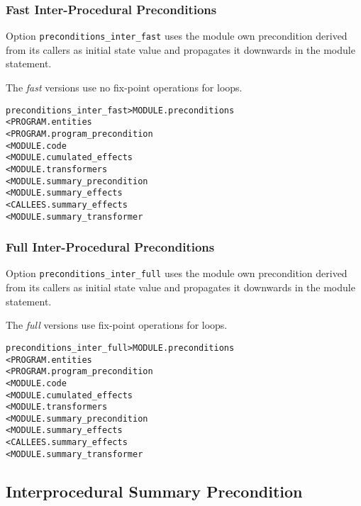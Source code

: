 \documentclass[a4paper]{report}
\newenvironment{PipsMake}{\begin{alltt}}{\end{alltt}}
\begin{document}
\subsubsection{Fast Inter-Procedural Preconditions}

Option \verb+preconditions_inter_fast+ uses the module own precondition
derived from its callers as initial state value and propagates it
downwards in the module statement.

The {\em fast} versions use no fix-point operations for loops.


\begin{PipsMake}

preconditions_inter_fast        > MODULE.preconditions
        < PROGRAM.entities
        < PROGRAM.program_precondition
        < MODULE.code
        < MODULE.cumulated_effects
        < MODULE.transformers
        < MODULE.summary_precondition
        < MODULE.summary_effects
        < CALLEES.summary_effects
        < MODULE.summary_transformer
\end{PipsMake}

\subsubsection{Full Inter-Procedural Preconditions}

Option \verb+preconditions_inter_full+ uses the module own precondition
derived from its callers as initial state value and propagates it
downwards in the module statement.

The {\em full} versions use fix-point operations for loops.

\begin{PipsMake}
preconditions_inter_full        > MODULE.preconditions
        < PROGRAM.entities
        < PROGRAM.program_precondition
        < MODULE.code
        < MODULE.cumulated_effects
        < MODULE.transformers
        < MODULE.summary_precondition
        < MODULE.summary_effects
        < CALLEES.summary_effects
        < MODULE.summary_transformer

\end{PipsMake}

\subsection{Interprocedural Summary Precondition}
\end{document}
